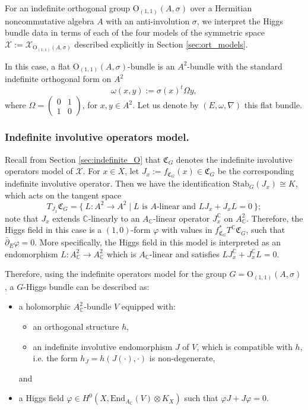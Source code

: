 \documentclass[oneside,11pt]{amsart}
\theoremstyle{definition}
\theoremstyle{remark}
\numberwithin{thm}{section}
\numberwithin{equation}{section}
\begin{document}
For an indefinite orthogonal group $\mathrm{O}_{(1,1)}(A,\sigma)$ over a Hermitian noncommutative algebra $A$ with an anti-involution $\sigma$, we interpret the Higgs bundle data in terms of each of the four models of the symmetric space $\mathcal X:=\mathcal{X}_{\mathrm{O}_{(1,1)}(A,\sigma)}$ described explicitly in Section \ref{sec:ort_models}. 

In this case, a flat $\mathrm{O}_{(1,1)}(A,\sigma)$-bundle is an $A^2$-bundle with the standard indefinite orthogonal form on $A^2$
\[\omega(x,y):=\sigma(x)^t\Omega y,\]
where $\Omega=\begin{pmatrix}0 & 1 \\ 1 & 0\end{pmatrix}$, for $x,y\in A^2$. Let us denote by $(E, \omega, \nabla)$ this flat bundle. 



\subsubsection{Indefinite involutive operators model.}

Recall from Section \ref{sec:indefinite_O} that $\mathfrak{C}_G$ denotes the indefinite involutive operators model of $\mathcal{X}$. For $x\in X$, let $J_x:=f_{\mathfrak{C}_G}(x)\in\mathfrak{C}_G$ be the corresponding indefinite involutive operator. Then we have the identification $\mathrm{Stab}_G(J_x)\cong K$, which acts on the tangent space
$$
T_{J_x}\mathfrak{C}_G=\{\ L\colon A^2\to A^2\mid \text{$L$ is $A$-linear and }LJ_x+J_xL=0\ \};
$$
note that $J_x$ extends $\mathbb{C}$-linearly to an $A_{\mathbb C}$-linear operator $J_{x}^{\mathbb{C}}$ on $A_{\mathbb{C}}^2$. Therefore, the Higgs field in this case is a $(1,0)$-form $\varphi$ with values in $f_{\mathfrak{C}_G}^*T^\mathbb{C}\mathfrak{C}_G$, such that $\bar\partial_E \varphi =0$. More specifically, the Higgs field in this model is interpreted as an endomorphism $ L\colon A_{\mathbb{C}}^2\to A_{\mathbb{C}}^2$ which is $A_{\mathbb{C}}$-linear and satisfies  $LJ_{x}^{\mathbb{C}}+J_{x}^{\mathbb{C}}L=0$.

Therefore, using the indefinite operators model for the group $G=\mathrm{O}_{(1,1)}(A,\sigma)$, a $G$-Higgs bundle can be described as: 
\begin{itemize}
    \item a holomorphic $A^2_{\mathbb{C}}$-bundle $V$ equipped with: 
    \begin{itemize}
        \item an orthogonal structure $h$,
        \item an indefinite involutive endomorphism $J$ of $V$, which is compatible with $h$, i.e. the form $h_J=h(J(\cdot),\cdot)$ is non-degenerate,
    \end{itemize}
    and
    \item a Higgs field $\varphi\in H^0(X,\mathrm{End}_{A_\mathbb C}(V)\otimes K_X)$ such that $\varphi J+J\varphi=0$.
\end{itemize}
\end{document}
